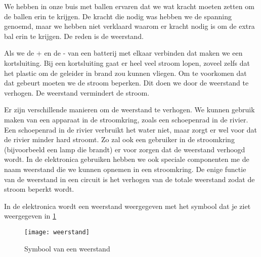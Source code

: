 We hebben in onze buis met ballen ervaren dat we wat kracht moeten zetten om de ballen erin te krijgen. De kracht die nodig was hebben we de spanning genoemd, maar we hebben niet verklaard waarom er kracht nodig is om de extra bal erin te krijgen. De reden is de weerstand.

Als we de + en de - van een batterij met elkaar verbinden dat maken we een kortsluiting. Bij een kortsluiting gaat er heel veel stroom lopen, zoveel zelfs dat het plastic om de geleider in brand zou kunnen vliegen. Om te voorkomen dat dat gebeurt moeten we de stroom beperken. Dit doen we door de weerstand te verhogen. De weerstand vermindert de stroom.

Er zijn verschillende manieren om de weerstand te verhogen. We kunnen gebruik maken van een apparaat in de stroomkring, zoals een schoepenrad in de rivier. Een schoepenrad in de rivier verbruikt het water niet, maar zorgt er wel voor dat de rivier minder hard stroomt. Zo zal ook een gebruiker in de stroomkring (bijvoorbeeld een lamp die brandt) er voor zorgen dat de weerstand verhoogd wordt. In de elektronica gebruiken hebben we ook speciale componenten me de naam weerstand die we kunnen opnemen in een stroomkring. De enige functie van de weerstand in een circuit is het verhogen van de totale weerstand zodat de stroom beperkt wordt.

In de elektronica wordt een weerstand weergegeven met het symbool dat je ziet weergegeven in \ref{symbool:weerstand}

\begin{figure}[h]
\texttt{[image: weerstand]}
\centering
\caption{Symbool van een weerstand}
\label{symbool:weerstand}
\end{figure}


